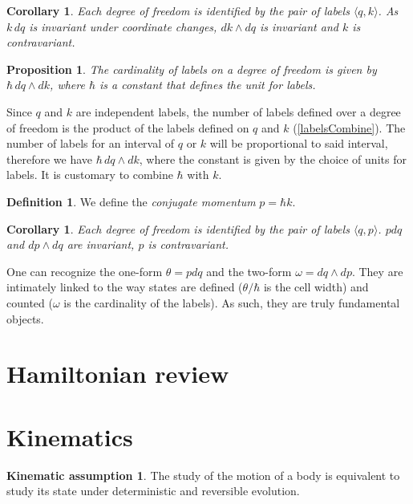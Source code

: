 \documentclass[aps,pra,10pt,twocolumn,floatfix,nofootinbib]{revtex4-1}
\newtheorem{cor}[thm]{Corollary}
\newtheorem{prop}[thm]{Proposition}
\theoremstyle{definition}
\newtheorem{defn}[thm]{Definition}
\newtheorem*{assump3}{Kinematic assumption}
\begin{document}
\begin{cor}\label{continuousLabels}
Each degree of freedom is identified by the pair of labels $\langle q,k \rangle$. As $k\,dq$ is invariant under coordinate changes, $dk\wedge dq$ is invariant and $k$ is contravariant.
\end{cor}

\begin{prop}\label{continuousLabels}
The cardinality of labels on a degree of freedom is given by $\hbar \, dq \wedge dk$, where $\hbar$ is a constant that defines the unit for labels.
\end{prop}

Since $q$ and $k$ are independent labels, the number of labels defined over a degree of freedom is the product of the labels defined on $q$ and $k$ (\ref{labelsCombine}). The number of labels for an interval of $q$ or $k$ will be proportional to said interval, therefore we have $\hbar \, dq \wedge dk$, where the constant is given by the choice of units for labels. It is customary to combine $\hbar$ with $k$.

\begin{defn}\label{sdof}
We define the \emph{conjugate momentum} $p=\hbar k$.
\end{defn}

\begin{cor}\label{continuousLabels}
Each degree of freedom is identified by the pair of labels $\langle q,p \rangle$. $p dq$ and $dp \wedge dq$ are invariant, $p$ is contravariant.
\end{cor}

One can recognize the one-form $\theta = p dq$ and the two-form $\omega = dq \wedge dp$. They are intimately linked to the way states are defined ($\theta / \hbar$ is the cell width) and counted ($\omega$ is the cardinality of the labels). As such, they are truly fundamental objects.

\section{Hamiltonian review}

\section{Kinematics}
\begin{assump3}\label{kinematicAssumption}
The study of the motion of a body is equivalent to study its state under deterministic and reversible evolution.
\end{assump3}
\end{document}
